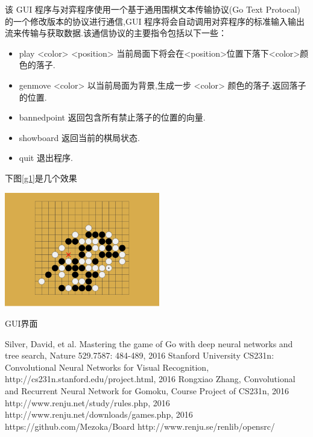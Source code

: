 \documentclass[twocolumn]{article}
\begin{document}
该 GUI 程序与对弈程序使用一个基于通用围棋文本传输协议(Go Text Protocal)的一个修改版本的协议进行通信,GUI 程序将会自动调用对弈程序的标准输入输出流来传输与获取数据.该通信协议的主要指令包括以下一些：

\begin{itemize}
	\item play <color> <position> 当前局面下将会在<position>位置下落下<color>颜色的落子.
	\item genmove <color> 以当前局面为背景,生成一步 <color> 颜色的落子.返回落子的位置.
	\item bannedpoint 返回包含所有禁止落子的位置的向量.
	\item showboard 返回当前的棋局状态.
	\item quit 退出程序.
\end{itemize}


下图\ref{g1}是几个效果

\begin{center}
\makeatletter
\def\@captype{figure}
\makeatother
\includegraphics [height=5cm]{1.png}
\caption{GUI界面}
\label{g1}
\end{center}


\begin{thebibliography}{1}
Silver, David, et al. Mastering the game of Go with deep neural networks and tree search, Nature 529.7587: 484-489, 2016
Stanford University CS231n: Convolutional Neural Networks for Visual Recognition, http://cs231n.stanford.edu/project.html, 2016
Rongxiao Zhang, Convolutional and Recurrent Neural Network for Gomoku, Course Project of CS231n, 2016
http://www.renju.net/study/rules.php, 2016
http://www.renju.net/downloads/games.php, 2016
https://github.com/Mezoka/Board
http://www.renju.se/renlib/opensrc/
\end{thebibliography}
\end{document}
